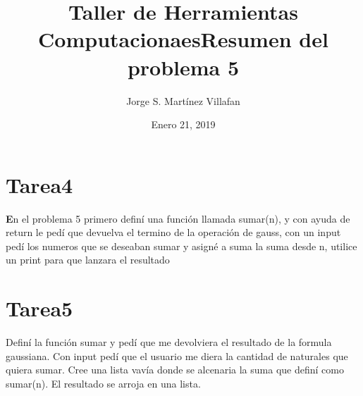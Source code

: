 \documentclass[letterpaper, 12pt, oneside]{article}%
\title{\Huge Taller de Herramientas Computacionaes}
\author{Jorge S. Martínez Villafan}
\date{Enero 21, 2019}
\begin{document}
\maketitle
\newpage
\title{Resumen del problema 5}
\section{Tarea4}
\textbf En el problema 5 primero definí una función llamada sumar(n), y con ayuda de return le pedí que devuelva el termino de la operación de gauss, con un input pedí los numeros que se deseaban sumar y asigné a suma la suma desde n, utilice un print para que lanzara el resultado
\section{Tarea5}
Definí la función sumar y pedí que me devolviera el resultado de la formula gaussiana. Con \color{blue} input \color{black} pedí que el usuario me diera la cantidad de naturales que quiera sumar. Cree una lista vavía donde se alcenaria la suma que definí como sumar(n). El resultado se arroja en una lista.
\end{document}
